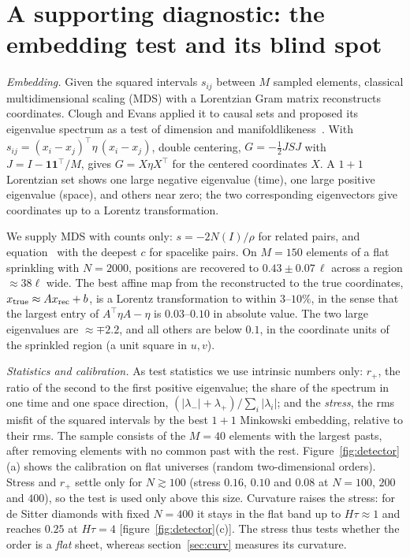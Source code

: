 \documentclass[12pt]{iopart}
\begin{document}
\section{A supporting diagnostic: the embedding test and its blind spot}\label{sec:embed}
\emph{Embedding.} Given the squared intervals $s_{ij}$ between $M$ sampled elements, classical multidimensional scaling (MDS) with a Lorentzian Gram matrix reconstructs coordinates. Clough and Evans applied it to causal sets and proposed its eigenvalue spectrum as a test of dimension and manifoldlikeness~\cite{CloughEvans16,Clough17}. With $s_{ij}=(x_i-x_j)^{\top}\eta\,(x_i-x_j)$, double centering, $G=-\tfrac12JSJ$ with $J=I-\mathbf1\mathbf1^{\top}/M$, gives $G=X\eta X^{\top}$ for the centered coordinates $X$. A $1+1$ Lorentzian set shows one large negative eigenvalue (time), one large positive eigenvalue (space), and others near zero; the two corresponding eigenvectors give coordinates up to a Lorentz transformation.

We supply MDS with counts only: $s=-2N(I)/\rho$ for related pairs, and equation~ with the deepest $c$ for spacelike pairs. On $M=150$ elements of a flat sprinkling with $N=2000$, positions are recovered to $0.43\pm0.07\,\ell$ across a region $\approx38\ell$ wide. The best affine map from the reconstructed to the true coordinates, $x_{\rm true}\approx Ax_{\rm rec}+b$, is a Lorentz transformation to within $3$--$10\%$, in the sense that the largest entry of $A^{\top}\eta A-\eta$ is $0.03$--$0.10$ in absolute value. The two large eigenvalues are $\approx\mp2.2$, and all others are below $0.1$, in the coordinate units of the sprinkled region (a unit square in $u,v$).

\emph{Statistics and calibration.} As test statistics we use intrinsic numbers only: $r_+$, the ratio of the second to the first positive eigenvalue; the share of the spectrum in one time and one space direction, $(|\lambda_-|+\lambda_+)/\sum_i|\lambda_i|$; and the \emph{stress}, the rms misfit of the squared intervals by the best $1+1$ Minkowski embedding, relative to their rms. The sample consists of the $M=40$ elements with the largest pasts, after removing elements with no common past with the rest. Figure~\ref{fig:detector}(a) shows the calibration on flat universes (random two-dimensional orders). Stress and $r_+$ settle only for $N\gtrsim100$ (stress $0.16$, $0.10$ and $0.08$ at $N=100$, $200$ and $400$), so the test is used only above this size. Curvature raises the stress: for de Sitter diamonds with fixed $N=400$ it stays in the flat band up to $H\tau\approx1$ and reaches $0.25$ at $H\tau=4$ [figure~\ref{fig:detector}(c)]. The stress thus tests whether the order is a \emph{flat} sheet, whereas section~\ref{sec:curv} measures its curvature.
\end{document}
